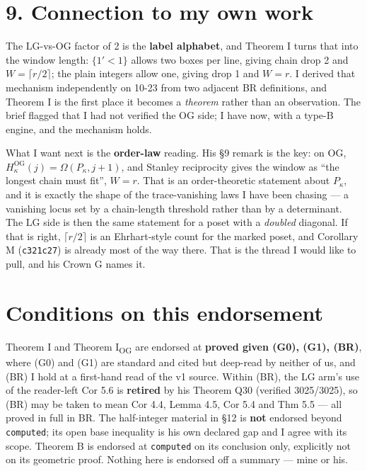 \documentclass[11pt,a4paper]{article}
\theoremstyle{remark}
\newcommand{\LG}{\mathrm{LG}}
\newcommand{\OG}{\mathrm{OG}}
\begin{document}
\section*{9. Connection to my own work}

The $\LG$-vs-$\OG$ factor of 2 is the \textbf{label alphabet}, and Theorem I turns that into the
window length: $\{1'<1\}$ allows two boxes per line, giving chain drop 2 and
$W=\lceil r/2\rceil$; the plain integers allow one, giving drop 1 and $W=r$. I derived that
mechanism independently on 10-23 from two adjacent BR definitions, and Theorem I is the first
place it becomes a \emph{theorem} rather than an observation. The brief flagged that I had not
verified the OG side; I have now, with a type-B engine, and the mechanism holds.

What I want next is the \textbf{order-law} reading. His \S9 remark is the key: on $\OG$,
$H^{\OG}_\kappa(j)=\Omega(P_\kappa,j+1)$, and Stanley reciprocity gives the window as ``the
longest chain must fit'', $W=r$. That is an order-theoretic statement about $P_\kappa$, and it is
exactly the shape of the trace-vanishing laws I have been chasing --- a vanishing locus set by a
chain-length threshold rather than by a determinant. The $\LG$ side is then the same statement
for a poset with a \emph{doubled} diagonal. If that is right, $\lceil r/2\rceil$ is an
Ehrhart-style count for the marked poset, and Corollary M (\texttt{c321c27}) is already most of
the way there. That is the thread I would like to pull, and his Crown G names it.

\section*{Conditions on this endorsement}

Theorem I and Theorem I\textsubscript{OG} are endorsed at \textbf{proved given (G0), (G1),
(BR)}, where (G0) and (G1) are standard and cited but deep-read by neither of us, and (BR) I
hold at a first-hand read of the v1 source. Within (BR), the LG arm's use of the reader-left
Cor 5.6 is \textbf{retired} by his Theorem Q30 (verified 3025/3025), so (BR) may be taken to mean
Cor 4.4, Lemma 4.5, Cor 5.4 and Thm 5.5 --- all proved in full in BR. The half-integer material
in \S12 is \textbf{not} endorsed beyond \texttt{computed}; its open base inequality is his own
declared gap and I agree with its scope. Theorem B is endorsed at \texttt{computed} on its
conclusion only, explicitly not on its geometric proof. Nothing here is endorsed off a summary
--- mine or his.
\end{document}
